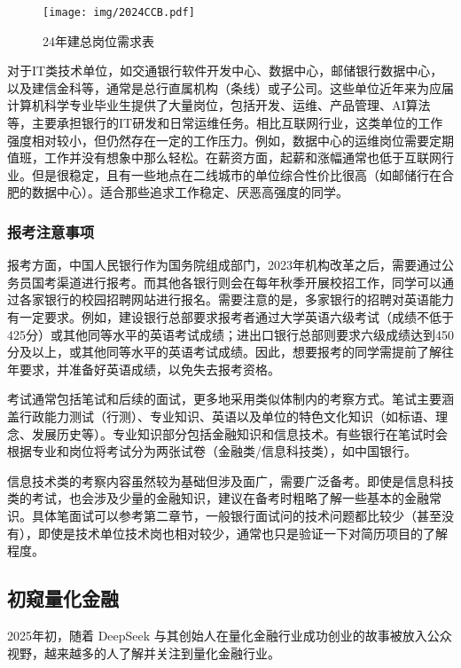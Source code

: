 \begin{figure}[htbp]
    \centering
    \texttt{[image: img/2024CCB.pdf]}
    \caption{24年建总岗位需求表}
    \label{岗位表}
\end{figure}



对于IT类技术单位，如交通银行软件开发中心、数据中心，邮储银行数据中心，以及建信金科等，通常是总行直属机构（条线）或子公司。这些单位近年来为应届计算机科学专业毕业生提供了大量岗位，包括开发、运维、产品管理、AI算法等，主要承担银行的IT研发和日常运维任务。相比互联网行业，这类单位的工作强度相对较小，但仍然存在一定的工作压力。例如，数据中心的运维岗位需要定期值班，工作并没有想象中那么轻松。在薪资方面，起薪和涨幅通常也低于互联网行业。但是很稳定，且有一些地点在二线城市的单位综合性价比很高（如邮储行在合肥的数据中心）。适合那些追求工作稳定、厌恶高强度的同学。



\subsubsection{报考注意事项}


报考方面，中国人民银行作为国务院组成部门，2023年机构改革之后，需要通过公务员国考渠道进行报考。而其他各银行则会在每年秋季开展校招工作，同学可以通过各家银行的校园招聘网站进行报名。需要注意的是，多家银行的招聘对英语能力有一定要求。例如，建设银行总部要求报考者通过大学英语六级考试（成绩不低于425分）或其他同等水平的英语考试成绩；进出口银行总部则要求六级成绩达到450分及以上，或其他同等水平的英语考试成绩。因此，想要报考的同学需提前了解往年要求，并准备好英语成绩，以免失去报考资格。


考试通常包括笔试和后续的面试，更多地采用类似体制内的考察方式。笔试主要涵盖行政能力测试（行测）、专业知识、英语以及单位的特色文化知识（如标语、理念、发展历史等）。专业知识部分包括金融知识和信息技术。有些银行在笔试时会根据专业和岗位将考试分为两张试卷（金融类/信息科技类），如中国银行。

信息技术类的考察内容虽然较为基础但涉及面广，需要广泛备考。即使是信息科技类的考试，也会涉及少量的金融知识，建议在备考时粗略了解一些基本的金融常识。具体笔面试可以参考第二章节，一般银行面试问的技术问题都比较少（甚至没有），即使是技术单位技术岗也相对较少，通常也只是验证一下对简历项目的了解程度。 


\subsection{初窥量化金融}

2025年初，随着 DeepSeek 与其创始人在量化金融行业成功创业的故事被放入公众视野，越来越多的人了解并关注到量化金融行业。


